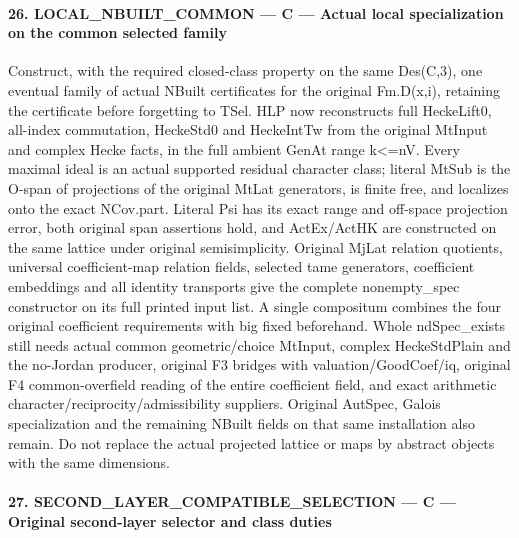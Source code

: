 \documentclass[11pt,a4paper]{article}
\numberwithin{equation}{section}
\theoremstyle{remark}\newtheorem{remark}[theorem]{Remark}
\begin{document}
\paragraph{26. LOCAL\_\allowbreak NBUILT\_\allowbreak COMMON — C — Actual local specialization on the common selected family}

Construct, with the required closed-class property on the same Des(C,3), one eventual family of actual NBuilt certificates for the original Fm.D(x,i), retaining the certificate before forgetting to TSel. HLP now reconstructs full HeckeLift0, all-index commutation, HeckeStd0 and HeckeIntTw from the original MtInput and complex Hecke facts, in the full ambient GenAt range k<=nV. Every maximal ideal is an actual supported residual character class; literal MtSub is the O-span of projections of the original MtLat generators, is finite free, and localizes onto the exact NCov.part. Literal Psi has its exact range and off-space projection error, both original span assertions hold, and ActEx/ActHK are constructed on the same lattice under original semisimplicity. Original MjLat relation quotients, universal coefficient-map relation fields, selected tame generators, coefficient embeddings and all identity transports give the complete nonempty\_\allowbreak spec constructor on its full printed input list. A single compositum combines the four original coefficient requirements with big fixed beforehand. Whole ndSpec\_\allowbreak exists still needs actual common geometric/choice MtInput, complex HeckeStdPlain and the no-Jordan producer, original F3 bridges with valuation/GoodCoef/iq, original F4 common-overfield reading of the entire coefficient field, and exact arithmetic character/reciprocity/admissibility suppliers. Original AutSpec, Galois specialization and the remaining NBuilt fields on that same installation also remain. Do not replace the actual projected lattice or maps by abstract objects with the same dimensions.



\paragraph{27. SECOND\_\allowbreak LAYER\_\allowbreak COMPATIBLE\_\allowbreak SELECTION — C — Original second-layer selector and class duties}
\end{document}
